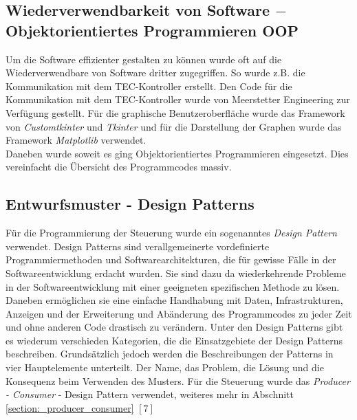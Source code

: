 \subsection{Wiederverwendbarkeit von Software $-$ Objektorientiertes Programmieren OOP}
Um die Software effizienter gestalten zu können wurde oft auf die Wiederverwendbare von Software dritter zugegriffen. So wurde z.B. die Kommunikation mit dem TEC-Kontroller erstellt. Den Code für die Kommunikation mit dem TEC-Kontroller wurde von Meerstetter Engineering zur Verfügung gestellt.
Für die graphische Benutzeroberfläche wurde das Framework von \textit{Customtkinter} und \textit{Tkinter} und für die Darstellung der Graphen wurde das Framework \textit{Matplotlib} verwendet.\\
Daneben wurde soweit es ging Objektorientiertes Programmieren eingesetzt. Dies vereinfacht die Übersicht des Programmcodes massiv.

\subsection{Entwurfsmuster - Design Patterns}
Für die Programmierung der Steuerung wurde ein sogenanntes \textit{Design Pattern} verwendet. Design Patterns sind verallgemeinerte vordefinierte Programmiermethoden und Softwarearchitekturen, die für gewisse Fälle in der Softwareentwicklung erdacht wurden. Sie sind dazu da wiederkehrende Probleme in der Softwareentwicklung mit einer geeigneten spezifischen Methode zu lösen. Daneben ermöglichen sie eine einfache Handhabung mit Daten, Infrastrukturen, Anzeigen und der Erweiterung und Abänderung des Programmcodes zu jeder Zeit und ohne anderen Code drastisch zu verändern. Unter den Design Patterns gibt es wiederum verschieden Kategorien, die die Einsatzgebiete der Design Patterns beschreiben. Grundsätzlich jedoch werden die Beschreibungen der Patterns in vier Hauptelemente unterteilt. Der Name, das Problem, die Lösung und die Konsequenz beim Verwenden des Musters. Für die Steuerung wurde das \textit{Producer - Consumer} - Design Pattern verwendet, weiteres mehr in Abschnitt \ref{section:_producer_consumer} $[7]$


